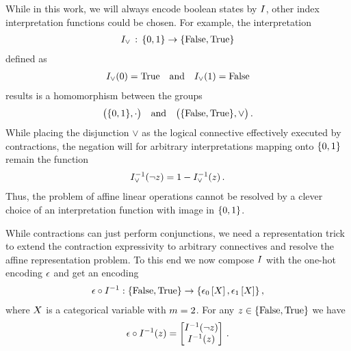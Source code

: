 While in this work, we will always encode boolean states by $I$, other index interpretation functions could be chosen.
For example, the interpretation
\begin{align*}
    I_{\lor} \,:\, \{0,1\}\rightarrow\{\mathrm{False},\mathrm{True}\}
\end{align*}
defined as
\begin{align*}
    I_{\lor}(0) = \mathrm{True} \quad\text{and}\quad I_{\lor}(1) = \mathrm{False}
\end{align*}
results is a homomorphism between the groups
\begin{align*}
    \big(\{0,1\},\cdot\big) \quad\text{and}\quad \big(\{\mathrm{False},\mathrm{True}\},\lor\big)  \, .
\end{align*}
While placing the disjunction $\lor$ as the logical connective effectively executed by contractions, the negation will for arbitrary interpretations mapping onto $\{0,1\}$ remain the function %
\begin{align*}
    I_{\lor}^{-1}(\lnot z) = 1 - I_{\lor}^{-1}(z)  \, .
\end{align*}
Thus, the problem of affine linear operations cannot be resolved by a clever choice of an interpretation function with image in $\{0,1\}$.



While contractions can just perform conjunctions, we need a representation trick to extend the contraction expressivity to arbitrary connectives and resolve the affine representation problem.
To this end we now compose $I$ with the one-hot encoding $\epsilon$ and get an encoding
\begin{align*}
    \epsilon\circ I^{-1} : \{\mathrm{False},\mathrm{True}\} \rightarrow \{\epsilon_{0}\left[X\right],\epsilon_{1}\left[X\right]\} \, ,
\end{align*}
where $X$ is a categorical variable with $m=2$.
For any $z\in\{\mathrm{False},\mathrm{True}\}$ we have
\begin{align*}
    \epsilon\circ I^{-1}(z) =
    \begin{bmatrix}
        I^{-1}(\lnot z) \\
        I^{-1}(z)
    \end{bmatrix}  \, .
\end{align*}


